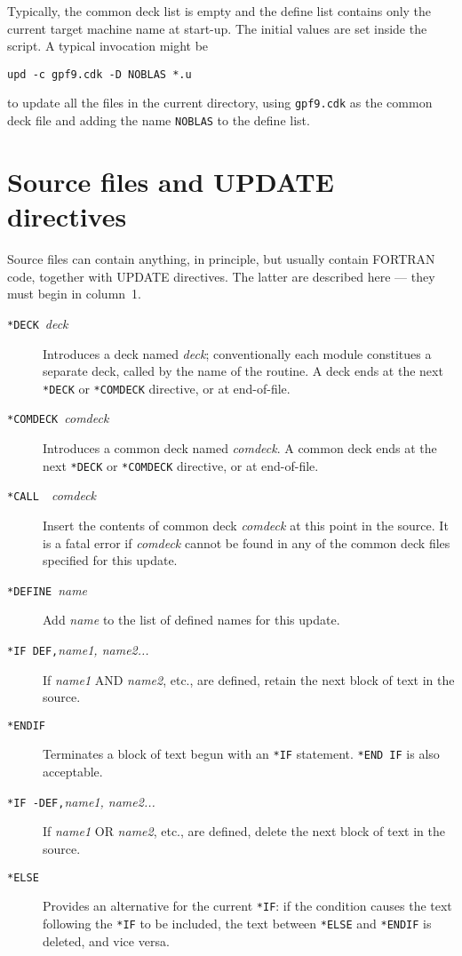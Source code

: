Typically, the common deck list is empty and the define list
contains only the current target machine name at start-up.  The
initial values are set inside the script.  A typical invocation
might be
\begin{verbatim}
upd -c gpf9.cdk -D NOBLAS *.u
\end{verbatim}
to update all the files in the current directory, using
\verb|gpf9.cdk| as the common deck file and adding the name
\verb|NOBLAS| to the define list.

\section{Source files and UPDATE directives}\label{sec:upddef}

Source files can contain anything, in principle, but usually
contain FORTRAN code, together with UPDATE directives.  The latter
are described here --- they must begin in column~1.
\begin{description}
\item[\verb|*DECK|~{\em deck\/}] Introduces a deck named {\em
deck\/}; conventionally each module constitues a separate
deck, called by the name of the routine.  A deck ends at the next
\verb|*DECK| or \verb|*COMDECK| directive, or at end-of-file.
\item[\verb|*COMDECK|~{\em comdeck\/}] Introduces a common deck
named {\em comdeck\/}.  A common deck ends at the next
\verb|*DECK| or \verb|*COMDECK| directive, or at end-of-file.
\item[\verb|*CALL |~{\em comdeck\/}] Insert the contents of common
deck {\em comdeck\/} at this point in the source.  It is a fatal
error if {\em comdeck\/} cannot be found in any of the common deck
files specified for this update.
\item[\verb|*DEFINE|~{\em name\/}] Add {\em name\/} to the list of
defined names for this update.
\item[\verb|*IF DEF,|{\em name1, name2...\/}] If {\em name1\/} AND
{\em name2\/}, etc., are defined, retain the next block of text
in the source.
\item[\verb|*ENDIF|] Terminates a block of text begun with an
\verb|*IF| statement.  \verb*|*END IF| is also acceptable.
\item[\verb|*IF -DEF,|{\em name1, name2...\/}] If {\em name1\/} OR
{\em name2\/}, etc., are defined, delete the next block of text
in the source.
\item[\verb|*ELSE|] Provides an alternative for the current
\verb|*IF|: if the condition causes the text following the
\verb|*IF| to be included, the text between \verb|*ELSE| and
\verb|*ENDIF| is deleted, and vice versa.
\end{description}

